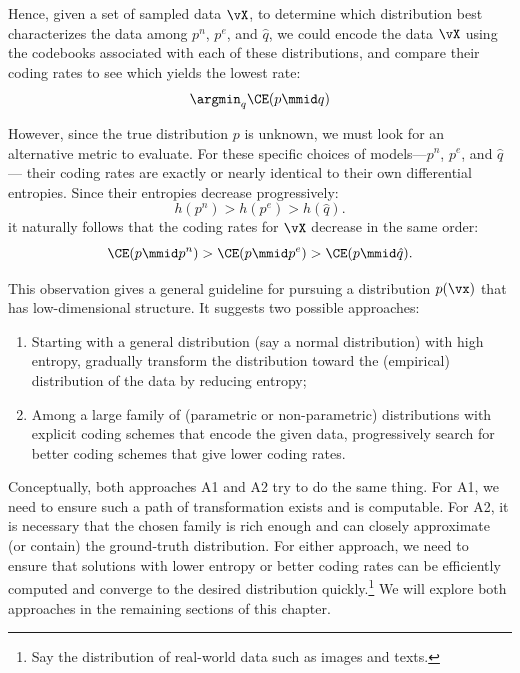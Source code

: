 \documentclass[../../book-main.tex]{subfiles}
\begin{document}
Hence, given a set of sampled data \(\vX\), to determine which
distribution best characterizes the data among
\(p^{n}\), \(p^{e}\), and \(\hat{q}\), we could encode the data \(\vX\)
using the codebooks associated with each of these distributions,
and compare their coding rates to see which yields the lowest rate:
\begin{equation}
    \argmin_{q} \CE(p \mmid q)
\end{equation}

However, since the true distribution \(p\) is unknown,
we must look for an alternative metric to evaluate.
For these specific choices of models—\(p^{n}\), \(p^{e}\), and \(\hat{q}\)—
their coding rates are exactly or nearly identical to their own differential entropies.
Since their entropies decrease progressively:
\begin{equation}
    h(p^{n}) > h(p^{e}) > h(\hat{q}).
\end{equation}
it naturally follows that the coding rates for \(\vX\) decrease in the same order:
\begin{equation}
    \CE(p \mmid p^{n}) > \CE(p \mmid p^{e}) > \CE(p \mmid \hat{q}).
\end{equation}

This observation gives a general guideline for pursuing a
distribution \(p(\vx)\) that has low-dimensional structure. It
suggests two possible approaches:
\begin{enumerate}[label={A\arabic*.}, leftmargin=*]
    \item Starting with a general distribution (say a normal
        distribution) with high entropy, gradually transform the
        distribution toward the (empirical) distribution of the data
        by reducing entropy;
    \item Among a large family of (parametric or non-parametric)
        distributions with explicit coding schemes that encode the
        given data, progressively search for better coding schemes
        that give lower coding rates.
\end{enumerate}
Conceptually, both approaches A1 and A2 try to do the same thing.
For A1, we need to ensure such a path of transformation exists and is
computable. For A2, it is necessary that the chosen family is rich
enough and can closely approximate (or contain) the ground-truth
distribution. For either approach, we need to ensure that solutions
with lower entropy or better coding rates can be efficiently computed
and converge to the desired distribution quickly.\footnote{Say the
distribution of real-world data such as images and texts.} We will
explore both approaches in the remaining sections of this chapter.
\end{document}
